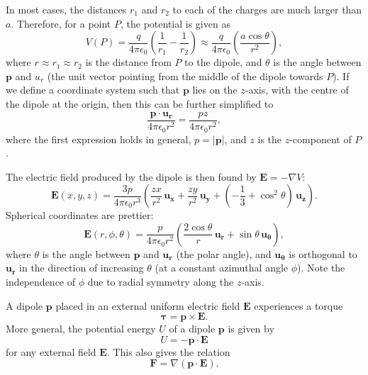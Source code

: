 \documentclass[a4paper, 12pt]{article}
\renewcommand{\vec}[1]{\mathbf{#1}}
\newcommand{\E}{\ensuremath{\vec{E}}}
\newcommand{\e}{\ensuremath{\epsilon_0}}
\begin{document}
    In most cases, the distances $r_1$ and $r_2$ to each of the charges are much larger than $a$. Therefore, for a point $P$, the potential is given as 
    \begin{equation}
        V(P) = \frac{q}{4\pi\e}\left( \frac{1}{r_1}-\frac{1}{r_2}\right) \approx \frac{q}{4\pi\e}\left(\frac{a\cos\theta}{r^2}\right),
    \end{equation}
    where $r \approx r_1 \approx r_2$ is the distance from $P$ to the dipole, and $\theta$ is the angle between $\vec{p}$ and $u_r$ (the unit vector pointing from the middle of the dipole towards $P$). If we define a coordinate system such that $\vec{p}$ lies on the $z$-axis, with the centre of the dipole at the origin, then this can be further simplified to
    \begin{equation}
        \frac{\vec{p}\cdot \vec{u_r}}{4\pi\e r^2} = \frac{pz}{4\pi\e r^2},
    \end{equation}
    where the first expression holds in general, $p = |\vec{p}|$, and $z$ is the $z$-component of $P$.
    
    The electric field produced by the dipole is then found by $\E = -\nabla V$:
    \begin{equation}
        \E(x, y, z) = \frac{3p}{4\pi\e r^3}\left(\frac{zx}{r^2}\,\vec{u_x} + \frac{zy}{r^2}\,\vec{u_y} + \left( -\frac{1}{3} +\cos^2\theta\right)\,\vec{u_z}\right).
    \end{equation}
    Spherical coordinates are prettier: 
    \begin{equation}
        \E(r, \phi, \theta) = \frac{p}{4\pi\e r^2}\left(\frac{2\cos\theta}{r}\,\vec{u_r} + \sin\theta \, \vec{u_\theta}\right),
    \end{equation}
    where $\theta$ is the angle between $\vec{p}$ and $\vec{u_r}$ (the polar angle), and $\vec{u_\theta}$ is orthogonal to $\vec{u_r}$ in the direction of increasing $\theta$ (at a constant azimuthal angle $\phi$). Note the independence of $\phi$ due to radial symmetry along the $z$-axis. 
    
    A dipole $\vec{p}$ placed in an external uniform electric field $\E$ experiences a torque
    \begin{equation}
        \vec{\tau} = \vec{p} \times \E.
    \end{equation}
    More general, the potential energy $U$ of a dipole $\vec{p}$ is given by
    \begin{equation}
        U = -\vec{p}\cdot \E
    \end{equation}
    for any external field $\E$. This also gives the relation 
    \begin{equation}
        \vec{F} = \nabla\left(\vec{p}\cdot\E\right).
    \end{equation}
\end{document}
